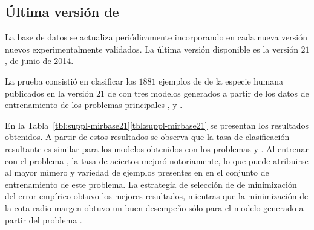 %
%
\subsection{Última versión de \mirbase}
%
La base de datos \work\mirbase{} se actualiza periódicamente
incorporando en cada nueva versión nuevos 
experimentalmente validados.
La última versión disponible es la versión $21$, de junio de 2014.

La prueba consistió en clasificar los $1881$ ejemplos de 
de la especie humana publicados en la versión $21$ de \work\mirbase{}
con tres modelos generados a partir de los datos de entrenamiento de
los problemas principales \prob\tripletsvm{}, \prob\mipred{} y
\prob\micropred{}.

En la \iflatexml{}Tabla~\ref{tbl:suppl-mirbase21}\else\autoref{tbl:suppl-mirbase21}\fi{}
se presentan los resultados obtenidos.
A partir de estos resultados se observa que la tasa de clasificación
resultante es similar para los modelos obtenidos con los problemas
\prob\tripletsvm{} y \prob\mipred{}.
Al entrenar con el problema \prob\micropred{}, la tasa de aciertos
mejoró notoriamente, lo que puede atribuirse al mayor número y
variedad de ejemplos presentes en en el conjunto de entrenamiento de
este problema.
La estrategia de selección de  de minimización del error
empírico obtuvo los mejores resultados, mientras que la minimización
de la cota radio-margen obtuvo un buen desempeño sólo para el modelo
generado a partir del problema \prob\micropred{}.
